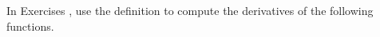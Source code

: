 {\noindent In Exercises}
{, use the definition to compute the derivatives of the following functions.
}
